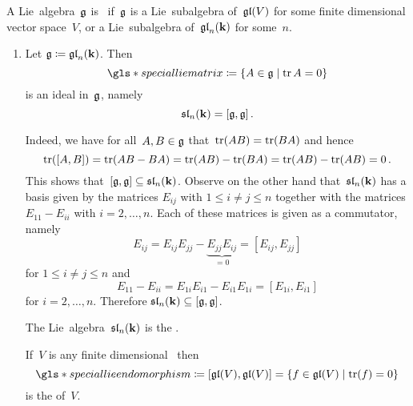 \begin{definition}
  A Lie~algebra~$\mathfrak{g}$ is~ if~$\mathfrak{g}$ is a Lie~subalgebra of~$\mathfrak{gl}(V)$ for some finite dimensional vector space~$V$, or a Lie~subalgebra of~$\mathfrak{gl}_n(\mathbf{k})$ for some~$n$.
\end{definition}


\begin{examples}
  \leavevmode
  \begin{enumerate}
  \item
    Let $\mathfrak{g} \coloneqq \mathfrak{gl}_n(\mathbf{k})$.
    Then
    \[
      \gls*{special lie matrix}
      \defined
      \{
        A \in \glie
      \suchthat
        \tr A = 0
      \}
    \]
    is an ideal in~$\mathfrak{g}$, namely
    \[
      \mathfrak{sl}_n(\mathbf{k})
      =
      [\mathfrak{g},\mathfrak{g}]  \,.
    \]
      
    Indeed, we have for all~$A, B \in \mathfrak{g}$ that~$\operatorname{tr}(AB) = \operatorname{tr}(BA)$ and hence
    \[
        \operatorname{tr}( [A,B] )
      = \operatorname{tr}(AB-BA)
      = \operatorname{tr}(AB) - \operatorname{tr}(BA)
      = \operatorname{tr}(AB) - \operatorname{tr}(AB)
      = 0  \,.
    \]
    This shows that~$[\mathfrak{g}, \mathfrak{g}] \subseteq \mathfrak{sl}_n(\mathbf{k})$.
    Observe on the other hand that~$\mathfrak{sl}_n(\mathbf{k})$ has a basis given by the matrices $E_{ij}$ with $1 \leq i \neq j \leq n$ together with the matrices $E_{11} - E_{ii}$ with $i = 2, \dotsc, n$.
    Each of these matrices is given as a commutator, namely
    \[
        E_{ij}
        =
        E_{ij} E_{jj} - \underbrace{ E_{jj} E_{ij} }_{=0}
        =
        [E_{ij}, E_{jj}]
    \]
    for $1 \leq i \neq j \leq n$ and
    \[
      E_{11} - E_{ii}
      =
      E_{1i} E_{i1} - E_{i1} E_{1i}
      =
      [E_{1i}, E_{i1}]
    \]
    for $i = 2, \dotsc, n$.
    Therefore $\mathfrak{sl}_n(\mathbf{k}) \subseteq [\mathfrak{g}, \mathfrak{g}]$.
    
    The Lie~algebra~$\mathfrak{sl}_n(\mathbf{k})$ is the .
    
    If~$V$ is any finite dimensional~{\vectorspace{$\kf$}} then
    \[
      \gls*{special lie endomorphism}
      \defined
      [\gllie(V), \gllie(V)]
      =
      \{
        f \in \gllie(V)
      \suchthat
        \tr(f) = 0
      \}
    \]
    is the  of~$V$.
   

\end{enumerate}
\end{examples}
